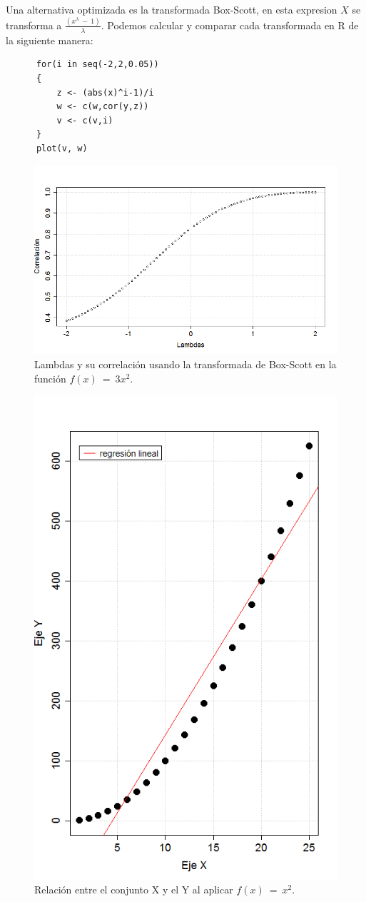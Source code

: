 \documentclass[]{article}
\begin{document}
Una alternativa optimizada es la transformada Box-Scott, en esta expresion $X$ se transforma a $\frac{(x^{\lambda }\ -\ 1)}{\lambda }$.
Podemos calcular y comparar cada transformada en R de la siguiente manera:
  \begin{lstlisting}
      for(i in seq(-2,2,0.05))
      {
          z <- (abs(x)^i-1)/i
          w <- c(w,cor(y,z))
          v <- c(v,i)
      }
      plot(v, w)
   \end{lstlisting}

\begin{figure}[hbt!] 
\centering \includegraphics[width=.7\linewidth]{Figuras/box-cox.png}                 \caption{Lambdas y su correlación usando la transformada de Box-Scott en la función $f\left(x\right)\ =\ 3x^2$.}
\label{fig:Correlacionbox}
\end{figure}

\begin{figure}[bt!]
\centering \includegraphics[width=.7\linewidth]{Figuras/CorrelacionCurva.png}                 \caption{Relación entre el conjunto X y el Y al aplicar $f\left(x\right)\ =\ x^2$.}
\label{fig:Curva}
\end{figure}




\printbibliography[title={Referencias}]
\end{document}

